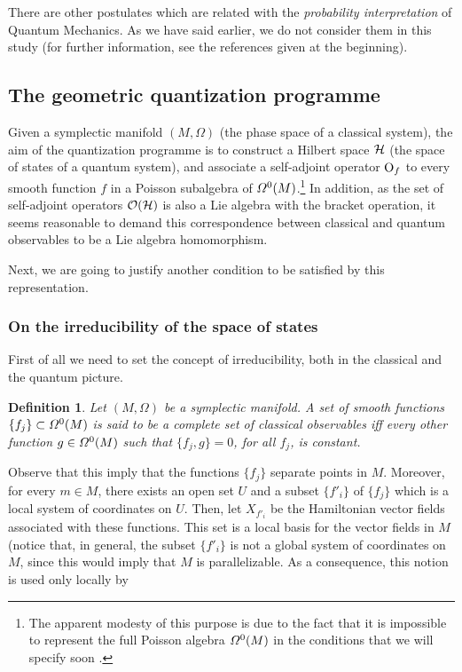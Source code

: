 \documentclass[12pt]{article}
\newtheorem{definition}{Definition}
\def\H{{\cal H}}
\def\Op{{\rm O}}
\begin{document}
There are other postulates which are related with
the {\it probability interpretation} of Quantum Mechanics.
As we have said earlier, we do not consider them in this study
(for further information, see the references given at the beginning).


\subsection{The geometric quantization programme}


Given a symplectic manifold $(M,\Omega )$ (the phase space of a
classical system),
the aim of the quantization programme is to construct a Hilbert space
$\H$
(the space of states of a quantum system),
and associate a self-adjoint operator $\Op_f$
to every smooth function $f$ in a Poisson subalgebra of
${\mit\Omega}^0(M)$.\footnote{
The apparent modesty of this purpose is due to
the fact that it is impossible to represent the full Poisson algebra
${\mit\Omega}^0(M)$ in the conditions that we will specify soon
\cite{Vh-51}.
}
In addition, as the set of self-adjoint operators
${\cal O}(\H )$ is also a Lie algebra with the bracket operation,
it seems reasonable to demand this correspondence
between classical and quantum observables to be a Lie algebra
homomorphism.

Next, we are going to justify another condition to be satisfied by this
representation.


\subsubsection{On the irreducibility of the space of states}


First of all we need to set the concept of irreducibility,
both in the classical and the quantum picture.

\begin{definition}
Let $(M,\Omega )$ be a symplectic manifold.
A set of smooth functions $\{ f_j \} \subset {\mit\Omega}^0(M)$
is said to be a {\rm complete set of classical observables}
iff every other function $g \in {\mit\Omega}^0(M)$
such that $\{ f_j,g \} = 0$, for all $f_j$, is constant.
\end{definition}

Observe that this imply that
the functions $\{ f_j \}$ separate points in $M$.
Moreover, for every $m \in M$, there exists an open set $U$
and a subset $\{ f'_i \}$ of $\{ f_j \}$ which is a local system of
coordinates on $U$.
Then, let $X_{f'_i}$ be the Hamiltonian vector fields
associated with these functions. This set is a local basis for the
vector fields in $M$
(notice that, in general, the subset $\{ f'_i \}$ is not a global
system of coordinates on $M$, since this would imply that $M$
is parallelizable. As a consequence, this notion is used only locally by
\end{document}
